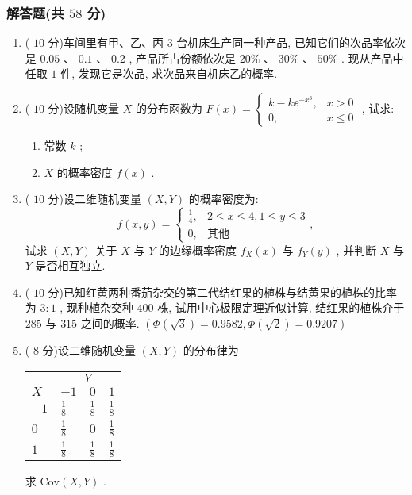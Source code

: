 \subsubsection{解答题(共 $58$ 分)}
\begin{enumerate}
	\item ( $10$ 分)车间里有甲、乙、丙 $3$ 台机床生产同一种产品, 已知它们的次品率依次是 $0.05$ 、 $0.1$ 、 $0.2$ , 产品所占份额依次是 $20\%$ 、 $30\%$ 、 $50\%$ . 现从产品中任取 $1$ 件, 发现它是次品, 求次品来自机床乙的概率.
	
	\item ( $10$ 分)设随机变量 $X$ 的分布函数为 $F(x)=
	\begin{cases}
	k-k\ee^{-x^3}, & x>0\\
	0, & x\leq0
	\end{cases}
	$ , 试求:
	\begin{enumerate}
		\item 常数 $k$ ;
		\item $X$ 的概率密度 $f(x)$ .
	\end{enumerate}

	\item ( $10$ 分)设二维随机变量 $(X,Y)$ 的概率密度为:
	\begin{equation*}
		f(x,y)=
		\begin{cases}
		\frac{1}{4}, & 2\leq x\leq4,1\leq y\leq3\\
		0, & \text{其他}
		\end{cases},
	\end{equation*}
	试求 $(X,Y)$ 关于 $X$ 与 $Y$ 的边缘概率密度 $f_X(x)$ 与 $f_Y(y)$ , 并判断 $X$ 与 $Y$ 是否相互独立.
	
	\item ( $10$ 分)已知红黄两种番茄杂交的第二代结红果的植株与结黄果的植株的比率为 $3:1$ , 现种植杂交种 $400$ 株, 试用中心极限定理近似计算, 结红果的植株介于 $285$ 与 $315$ 之间的概率. $\left(\varPhi\left(\sqrt{3}\right)=0.9582,\varPhi\left(\sqrt{2}\right)=0.9207\right)$
	
	\item ( $8$ 分)设二维随机变量 $(X,Y)$ 的分布律为
	\begin{center}
		\begin{tabularx}{0.8\textwidth}{ZZZZ}
			\hline
			 & \\
			$X$ & $-1$ & $0$ & $1$\\
			\hline
			$-1$ & $\frac{1}{8}$ & $\frac{1}{8}$ & $\frac{1}{8}$\\
			$0$ & $\frac{1}{8}$ & $0$ & $\frac{1}{8}$\\
			$1$ & $\frac{1}{8}$ & $\frac{1}{8}$ & $\frac{1}{8}$\\
			\hline
		\end{tabularx}
	\end{center}
	求 $\mathrm{Cov}(X,Y)$ .
	

\end{enumerate}
